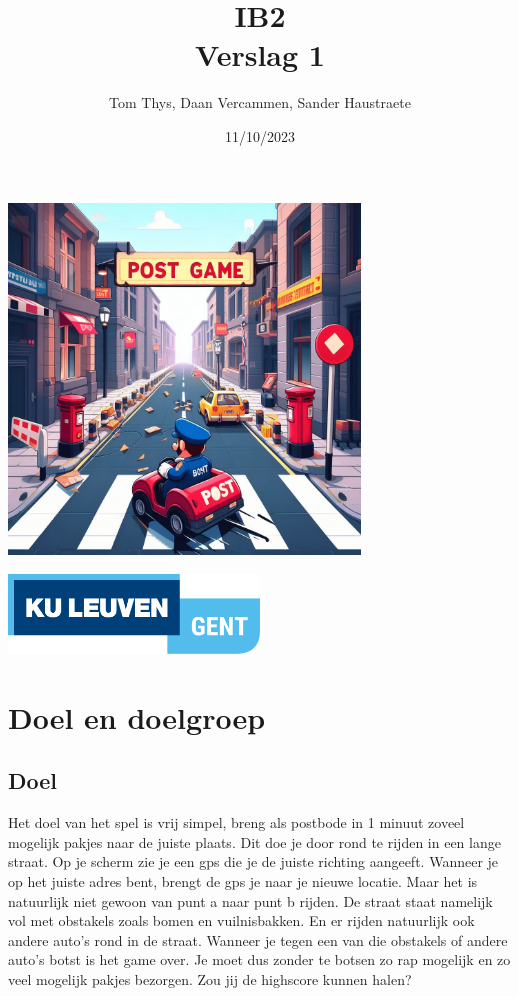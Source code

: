 \documentclass{article}
\title{IB2\\
Verslag 1}
\date{11/10/2023}
\author{Tom Thys, Daan Vercammen, Sander Haustraete}
\begin{document}
\maketitle

\begin{minipage}{\textwidth}
    \centering
    \includegraphics[width=0.7\textwidth]{fotos/_a1a1db80-3fb5-41c9-9da6-cb8f494513cb.jpg}
\end{minipage}

\vspace{50pt}

\begin{minipage}{\textwidth}
    \centering
    \includegraphics[width=0.5\textwidth]{fotos/Logo.png}

\end{minipage}

\newpage
{}

\section{Doel en doelgroep}
\subsection{Doel}
Het doel van het spel is vrij simpel, breng als postbode in 1 minuut zoveel mogelijk pakjes naar de juiste plaats. Dit doe je 
door rond te rijden in een lange straat. Op je scherm zie je een gps die je de juiste richting aangeeft. Wanneer je op het juiste adres
bent, brengt de gps je naar je nieuwe locatie. Maar het is natuurlijk niet gewoon van punt a naar punt b rijden. De straat staat namelijk
vol met obstakels zoals bomen en vuilnisbakken. En er rijden natuurlijk ook andere auto's rond in de straat. Wanneer je tegen een van 
die obstakels of andere auto's botst is het game over. Je moet dus zonder te botsen zo rap mogelijk en zo veel mogelijk pakjes 
bezorgen. Zou jij de highscore kunnen halen? 
\end{document}
